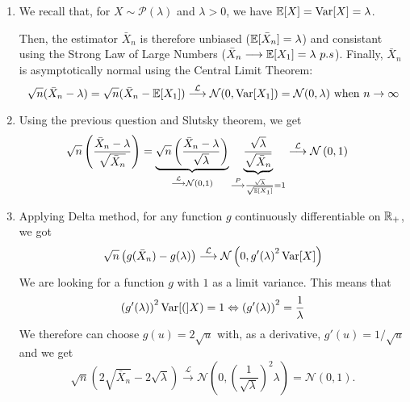 \begin{solution}
  \begin{enumerate}
    \item We recall that, for $X \sim \mathcal P(\lambda)$ and $\lambda>0$, we have
          $\mathbb{E}[X] = \operatorname{Var}[X] = \lambda$.

          Then, the estimator $\bar X_n$ is therefore unbiased ($ \mathbb{E}[\bar X_n] = \lambda $) and consistant using the Strong Law of Large Numbers
          ($ \bar X_n\longrightarrow \mathbb{E}[X_1] = \lambda~p.s$). Finally, $\bar{X}_n$
          is asymptotically normal using the Central Limit Theorem:
          \[
            \sqrt{n} ({\bar{X}}_n - \lambda) = \sqrt{n} ( \bar X_n - \mathbb{E}[X_1]) \stackrel{\mathcal
              L}\longrightarrow\mathcal N(0,\operatorname{Var}[X_1])=\mathcal
            N(0,\lambda) \text{ when } n \to \infty
          \]

    \item Using the previous question and Slutsky theorem, we get
          \begin{align*}
            \sqrt{n} \left(\frac{\bar X_n-\lambda}{\sqrt{\bar X_n}} \right)
             & = \underbrace{ \sqrt n \left(\frac{\bar X_n-\lambda}{\sqrt{\lambda}} \right) }_{\stackrel{\mathcal L}\longrightarrow\mathcal N(0,1)} \underbrace{\frac{\sqrt{\lambda}}{\sqrt{\bar X_n}}}_{\stackrel{P}\longrightarrow \frac{\sqrt{\lambda}}{\sqrt{\mathbb{E}[X_1]}}=1}
            \stackrel{\mathcal L}\longrightarrow \mathcal{N} \left(0, 1 \right)
          \end{align*}
    \item Applying Delta method, for any function $g$ continuously differentiable on $\mathbb{R}_+$, we got
          \[
            \sqrt{n} \left(g(\bar X_n)-g(\lambda) \right)\stackrel{\mathcal L}\longrightarrow \mathcal{N} \left(0, {g'(\lambda)}^2\operatorname{Var}[X] \right)
          \]
          We are looking for a function $g$ with $1$ as a limit variance. This means that
          \[
            {(g'(\lambda))}^2\operatorname{Var}[(]X)=1
            \Leftrightarrow {(g'(\lambda))}^2 = \frac1\lambda
          \]
          We therefore can choose $g(u) = 2\sqrt u$ with, as a derivative, $g'(u)= 1/\sqrt u$ and we get
          \[
            \sqrt n
            \left(2\sqrt{\bar X_n}-2\sqrt \lambda \right)\stackrel{\mathcal
              L}\longrightarrow\mathcal
            N\left(0,{\left(\frac1{\sqrt\lambda}\right)}^2\lambda\right)=\mathcal N(0,1).
          \]
  \end{enumerate}
\end{solution}

